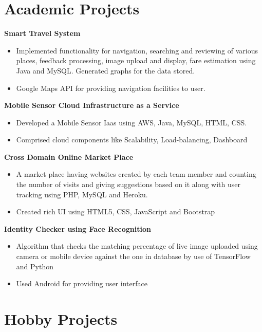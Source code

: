 \documentclass[margin]{res}
\begin{document}
\begin{resume}
\section{Academic Projects}
 
 {\bf Smart Travel System }
 \begin{itemize} \itemsep -2pt  %
 \item Implemented functionality for navigation, searching and reviewing of various places, feedback processing, image upload and display, fare estimation using Java and MySQL. Generated graphs for the data stored.
 \item  Google Maps API for providing navigation facilities to user.
 \end{itemize}
 
 {\bf Mobile Sensor Cloud Infrastructure as a Service }
 \begin{itemize} \itemsep -2pt  %
 \item Developed a Mobile Sensor Iaas  using  AWS, Java, MySQL, HTML, CSS.
 \item Comprised cloud components like Scalability, Load-balancing, Dashboard
 \end{itemize}
 
 {\bf Cross Domain Online Market Place}
 \begin{itemize} \itemsep -2pt  %
 \item A market place having websites created by each team member and counting the number of visits and giving suggestions based on it along with user tracking using PHP, MySQL and Heroku.
 \item Created rich UI using HTML5, CSS, JavaScript and Bootstrap 
 \end{itemize}

 {\bf Identity Checker using Face Recognition }
 \begin{itemize} \itemsep -2pt  %
 \item Algorithm that checks the matching percentage of live image uploaded using camera or mobile device against the one in database by use of TensorFlow and Python
 \item Used Android for providing user interface
 \end{itemize}
 
 \section{Hobby Projects}
 

\end{resume}
\end{document}
